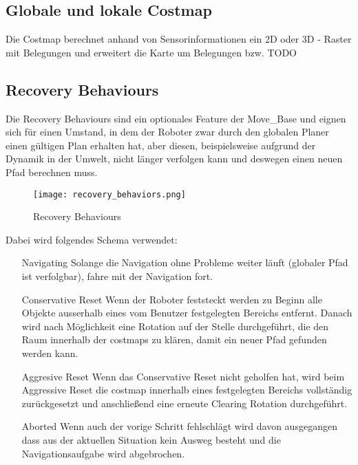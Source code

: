 \documentclass[oribibl]{llncs}
\begin{document}
\subsection{Globale und lokale Costmap}
Die Costmap berechnet anhand von Sensorinformationen ein 2D oder 3D - Raster mit Belegungen und erweitert die Karte um Belegungen bzw. TODO
\cite{costmap2d}
\subsection{Recovery Behaviours}
Die Recovery Behaviours sind ein optionales Feature der Move\_Base und eignen sich für einen Umstand, in dem der Roboter zwar durch den globalen Planer einen gültigen Plan erhalten hat, aber diesen, beispielsweise aufgrund der Dynamik in der Umwelt, nicht länger verfolgen kann und deswegen einen neuen Pfad berechnen muss.\\
\begin{figure}
	\centering
  \texttt{[image: recovery\_behaviors.png]}
	\caption{Recovery Behaviours}
	\cite{recoveryBehavioursImage}
	\label{fig2}
\end{figure}

Dabei wird folgendes Schema verwendet:\cite{recoveryBehaviours}\\
\begin{enumerate}
\item [Navigating] Solange die Navigation ohne Probleme weiter läuft (globaler Pfad ist verfolgbar), fahre mit der Navigation fort.
\item [Conservative Reset] Wenn der Roboter feststeckt werden zu Beginn alle Objekte ausserhalb eines vom Benutzer festgelegten Bereichs entfernt. Danach wird nach Möglichkeit eine Rotation auf der Stelle durchgeführt, die den Raum innerhalb der costmaps zu klären, damit ein neuer Pfad gefunden werden kann.
\item [Aggresive Reset] Wenn das Conservative Reset nicht geholfen hat, wird beim Aggressive Reset die costmap innerhalb eines festgelegten Bereichs vollständig zurückgesetzt und anschließend eine erneute Clearing Rotation durchgeführt.
\item [Aborted] Wenn auch der vorige Schritt fehlschlägt wird davon ausgegangen dass aus der aktuellen Situation kein Ausweg besteht und die Navigationsaufgabe wird abgebrochen.
\end{enumerate}
\end{document}

